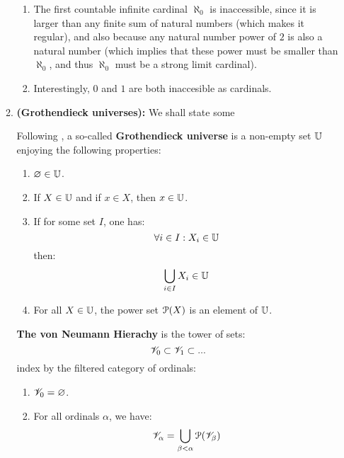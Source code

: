 \begin{enumerate}
\begin{enumerate}
\begin{example}
                        \noindent
                        \begin{enumerate}
                            \item The first countable infinite cardinal $\aleph_0$ is inaccessible, since it is larger than any finite sum of natural numbers (which makes it regular), and also because any natural number power of $2$ is also a natural number (which implies that these power must be smaller than $\aleph_0$, and thus $\aleph_0$ must be a strong limit cardinal).
                            \item Interestingly, $0$ and $1$ are both inaccesible as cardinals.
                        \end{enumerate}
                    \end{example}
                \item \textbf{(Grothendieck universes):} We shall state some 
                    \begin{definition} \label{def: grothendieck_universes} 
                        Following \cite[Expos\'e I, Section 0]{sga4}, a so-called \textbf{Grothendieck universe} is a non-empty set $\mathbb{U}$ enjoying the following properties:
                            \begin{enumerate}
                                \item $\varnothing \in \mathbb{U}$.
                                \item If $X \in \mathbb{U}$ and if $x \in X$, then $x \in \mathbb{U}$.
                                \item If for some set $I$, one has:
                                    $$\forall i \in I: X_i \in \mathbb{U}$$
                                then:
                                    $$\bigcup_{i \in I} X_i \in \mathbb{U}$$
                                \item For all $X \in \mathbb{U}$, the power set $\mathcal{P}(X)$ is an element of $\mathbb{U}$.
                            \end{enumerate}
                    \end{definition}
                    
                    \begin{definition} \label{def: von_neumann_hierachy}
                        \textbf{The von Neumann Hierachy} is the tower of sets:
                            $$\mathscr{V}_0 \subset \mathscr{V}_1 \subset ...$$
                        index by the filtered category of ordinals:
                            \begin{enumerate}
                                \item $\mathscr{V}_0 = \varnothing$. 
                                \item For all ordinals $\alpha$, we have:
                                    $$\mathscr{V}_{\alpha} = \bigcup_{\beta < \alpha} \mathcal{P}(\mathscr{V}_{\beta})$$
                            \end{enumerate}
                    \end{definition}
                    

\end{enumerate}
\end{enumerate}
